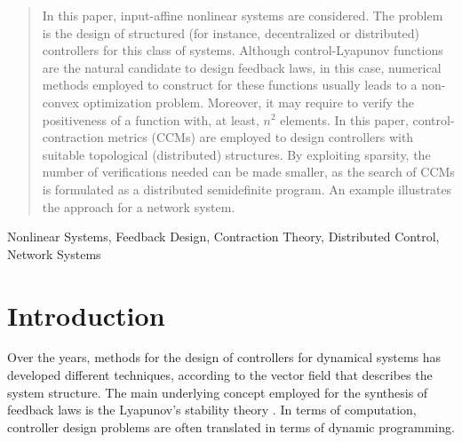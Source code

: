\documentclass[10pt,twocolumn,twoside]{IEEEtran}
\theoremstyle{plain}
\theoremstyle{definition}
\theoremstyle{remark}
\begin{document}
\maketitle

\begin{abstract}
In this paper, input-affine nonlinear systems are considered. The problem is the design of structured (for instance, decentralized or distributed) controllers for this class of systems. Although control-Lyapunov functions are the natural candidate to design feedback laws, in this case, numerical methods employed to construct for these functions usually leads to a non-convex optimization problem. Moreover, it may require to verify the positiveness of a function with, at least, $n^2$ elements. In this paper, control-contraction metrics (CCMs) are employed to design controllers with suitable topological (distributed) structures. By exploiting sparsity, the number of verifications needed can be made smaller, as the search of CCMs is formulated as a distributed semidefinite program. An example illustrates the approach for a network system.
\end{abstract}

\begin{IEEEkeywords}
Nonlinear Systems, Feedback Design, Contraction Theory, Distributed Control, Network Systems
\end{IEEEkeywords}






%
\IEEEpeerreviewmaketitle



\section{Introduction}

Over the years, methods for the design of controllers for dynamical systems has developed different techniques, according to the vector field that describes the system structure. The main underlying concept employed for the synthesis of feedback laws is the Lyapunov's stability theory \cite{Bhatia1970,Rouche:1977}. In terms of computation, controller design problems are often translated in terms of dynamic programming.
\end{document}
